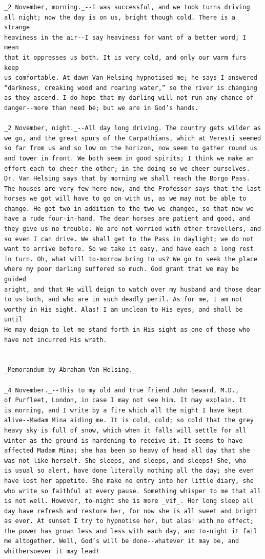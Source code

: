 \documentclass{article}
\begin{document}
\begin{verbatim}
_2 November, morning._--I was successful, and we took turns driving
all night; now the day is on us, bright though cold. There is a strange
heaviness in the air--I say heaviness for want of a better word; I mean
that it oppresses us both. It is very cold, and only our warm furs keep
us comfortable. At dawn Van Helsing hypnotised me; he says I answered
“darkness, creaking wood and roaring water,” so the river is changing
as they ascend. I do hope that my darling will not run any chance of
danger--more than need be; but we are in God’s hands.

_2 November, night._--All day long driving. The country gets wilder as
we go, and the great spurs of the Carpathians, which at Veresti seemed
so far from us and so low on the horizon, now seem to gather round us
and tower in front. We both seem in good spirits; I think we make an
effort each to cheer the other; in the doing so we cheer ourselves.
Dr. Van Helsing says that by morning we shall reach the Borgo Pass.
The houses are very few here now, and the Professor says that the last
horses we got will have to go on with us, as we may not be able to
change. He got two in addition to the two we changed, so that now we
have a rude four-in-hand. The dear horses are patient and good, and
they give us no trouble. We are not worried with other travellers, and
so even I can drive. We shall get to the Pass in daylight; we do not
want to arrive before. So we take it easy, and have each a long rest
in turn. Oh, what will to-morrow bring to us? We go to seek the place
where my poor darling suffered so much. God grant that we may be guided
aright, and that He will deign to watch over my husband and those dear
to us both, and who are in such deadly peril. As for me, I am not
worthy in His sight. Alas! I am unclean to His eyes, and shall be until
He may deign to let me stand forth in His sight as one of those who
have not incurred His wrath.


_Memorandum by Abraham Van Helsing._

_4 November._--This to my old and true friend John Seward, M.D.,
of Purfleet, London, in case I may not see him. It may explain. It
is morning, and I write by a fire which all the night I have kept
alive--Madam Mina aiding me. It is cold, cold; so cold that the grey
heavy sky is full of snow, which when it falls will settle for all
winter as the ground is hardening to receive it. It seems to have
affected Madam Mina; she has been so heavy of head all day that she
was not like herself. She sleeps, and sleeps, and sleeps! She, who
is usual so alert, have done literally nothing all the day; she even
have lost her appetite. She make no entry into her little diary, she
who write so faithful at every pause. Something whisper to me that all
is not well. However, to-night she is more _vif_. Her long sleep all
day have refresh and restore her, for now she is all sweet and bright
as ever. At sunset I try to hypnotise her, but alas! with no effect;
the power has grown less and less with each day, and to-night it fail
me altogether. Well, God’s will be done--whatever it may be, and
whithersoever it may lead!


\end{verbatim}
\end{document}
